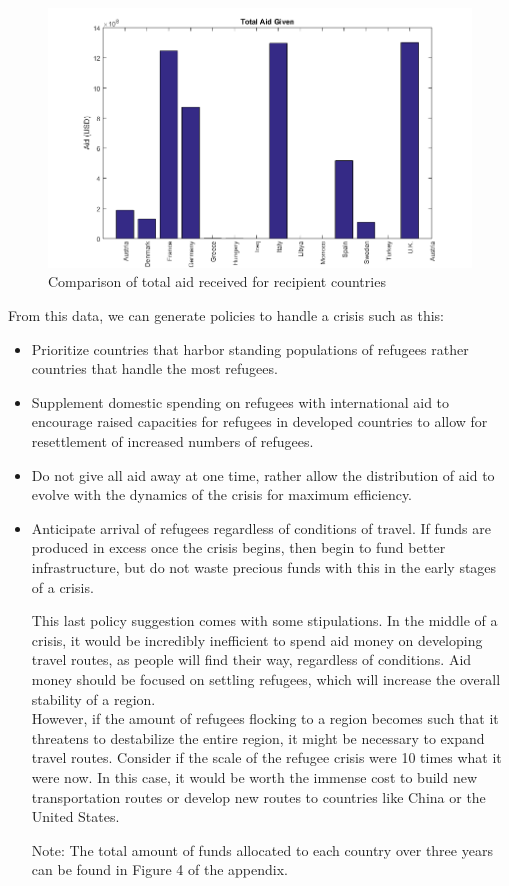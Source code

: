 \documentclass{article}
\begin{document}
\begin{figure}[H]
    \centering
    \includegraphics[width=.7\textwidth]{aid/totalaidgiven.png}
    \caption [width=0.9\textwidth]{\centering Comparison of total aid received for recipient countries}
\end{figure}

From this data, we can generate policies to handle a crisis such as this: 
\begin{itemize}
    \item Prioritize countries that harbor standing populations of refugees rather countries that handle the most refugees.
    \item Supplement domestic spending on refugees with international aid to encourage raised capacities for refugees in developed countries to allow for resettlement of increased numbers of refugees.
    \item Do not give all aid away at one time, rather allow the distribution of aid to evolve with the dynamics of the crisis for maximum efficiency.
    \item Anticipate arrival of refugees regardless of conditions of travel. If funds are produced in excess once the crisis begins, then begin to fund better infrastructure, but do not waste precious funds with this in the early stages of a crisis.
    
    This last policy suggestion comes with some stipulations. In the middle of a crisis, it would be incredibly inefficient to spend aid money on developing travel routes, as people will find their way, regardless of conditions. Aid money should be focused on settling refugees, which will increase the overall stability of a region. \\
    However, if the amount of refugees flocking to a region becomes such that it threatens to destabilize the entire region, it might be necessary to expand travel routes. Consider if the scale of the refugee crisis were 10 times what it were now. In this case, it would be worth the immense cost to build new transportation routes or develop new routes to countries like China or the United States.
    
    Note: The total amount of funds allocated to each country over three years can be found in Figure 4 of the appendix.
\end{itemize}
\end{document}
